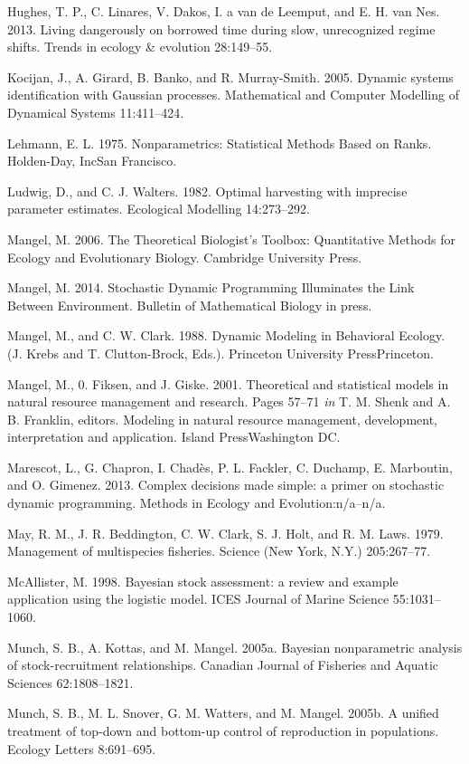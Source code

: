 \documentclass[author-year, 12pt,review]{components/elsarticle} %
\begin{document}
Hughes, T. P., C. Linares, V. Dakos, I. a van de Leemput, and E. H. van
Nes. 2013. Living dangerously on borrowed time during slow, unrecognized
regime shifts. Trends in ecology \& evolution 28:149--55.

Kocijan, J., A. Girard, B. Banko, and R. Murray-Smith. 2005. Dynamic
systems identification with Gaussian processes. Mathematical and
Computer Modelling of Dynamical Systems 11:411--424.

Lehmann, E. L. 1975. Nonparametrics: Statistical Methods Based on Ranks.
Holden-Day, IncSan Francisco.

Ludwig, D., and C. J. Walters. 1982. Optimal harvesting with imprecise
parameter estimates. Ecological Modelling 14:273--292.

Mangel, M. 2006. The Theoretical Biologist's Toolbox: Quantitative
Methods for Ecology and Evolutionary Biology. Cambridge University
Press.

Mangel, M. 2014. Stochastic Dynamic Programming Illuminates the Link
Between Environment. Bulletin of Mathematical Biology in press.

Mangel, M., and C. W. Clark. 1988. Dynamic Modeling in Behavioral
Ecology. (J. Krebs and T. Clutton-Brock, Eds.). Princeton University
PressPrinceton.

Mangel, M., 0. Fiksen, and J. Giske. 2001. Theoretical and statistical
models in natural resource management and research. Pages 57--71
\emph{in} T. M. Shenk and A. B. Franklin, editors. Modeling in natural
resource management, development, interpretation and application. Island
PressWashington DC.

Marescot, L., G. Chapron, I. Chadès, P. L. Fackler, C. Duchamp, E.
Marboutin, and O. Gimenez. 2013. Complex decisions made simple: a primer
on stochastic dynamic programming. Methods in Ecology and
Evolution:n/a--n/a.

May, R. M., J. R. Beddington, C. W. Clark, S. J. Holt, and R. M. Laws.
1979. Management of multispecies fisheries. Science (New York, N.Y.)
205:267--77.

McAllister, M. 1998. Bayesian stock assessment: a review and example
application using the logistic model. ICES Journal of Marine Science
55:1031--1060.

Munch, S. B., A. Kottas, and M. Mangel. 2005a. Bayesian nonparametric
analysis of stock-recruitment relationships. Canadian Journal of
Fisheries and Aquatic Sciences 62:1808--1821.

Munch, S. B., M. L. Snover, G. M. Watters, and M. Mangel. 2005b. A
unified treatment of top-down and bottom-up control of reproduction in
populations. Ecology Letters 8:691--695.
\end{document}
